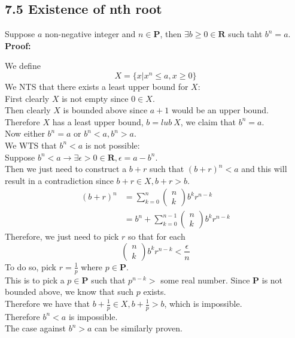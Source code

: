 \documentclass{article}
\begin{document}
\subsection*{7.5 Existence of nth root}
Suppose $a$ non-negative integer and $n \in \mathbf{P}$, then $\exists b \geq 0 \in \mathbf{R}$ such taht $b^n = a$.\\
\textbf{Proof:}
\begin{addmargin}[1em]{0em}
    We define
    \begin{equation}
        X = \{x | x^n \leq a, x \geq 0\}
    \end{equation}
    We NTS that there exists a least upper bound for $X$:\\
    First clearly $X$ is not empty since $0 \in X$.\\
    Then clearly $X$ is bounded above since $a+1$ would be an upper bound.\\
    Therefore $X$ has a least upper bound, $b = lub\ X$, we claim that $b^n = a$.\\
    Now either $b^n = a$ or $b^n < a, b^n > a$.\\
    We WTS that $b^n < a$ is not possible:\\
    Suppose $b^n < a \rightarrow \exists \epsilon > 0 \in \mathbf{R}, \epsilon = a - b^n$.\\
    Then we just need to construct a $b+r$ such that $(b+r)^n < a$ and this will result in a contradiction since $b+r \in X, b+r > b$.\\
    \begin{equation*}
        \begin{split}
            (b+r)^n &= \sum_{k=0}^{n} \begin{pmatrix}
                n\\
                k
            \end{pmatrix} b^k r^{n-k}\\
            &= b^n + \sum_{k=0}^{n-1} \begin{pmatrix}
                n\\
                k
            \end{pmatrix} b^k r^{n-k}
        \end{split}
    \end{equation*}
    Therefore, we just need to pick $r$ so that for each
    \begin{equation*}
        \begin{pmatrix}
            n\\
            k
        \end{pmatrix} b^k r^{n-k} < \frac{\epsilon}{n}
    \end{equation*}
    To do so, pick $r = \frac{1}{p}$ where $p \in \mathbf{P}$.\\
    This is to pick a $p \in \mathbf{P}$ such that $p^{n-k} >$ some real number. Since $\mathbf{P}$ is not bounded above, we know that such $p$ exists.\\
    Therefore we have that $b + \frac{1}{p} \in X, b + \frac{1}{p} > b$, which is impossible.\\
    Therefore $b^n < a$ is impossible.\\
    The case against $b^n > a$ can be similarly proven.
\end{addmargin}
\end{document}
